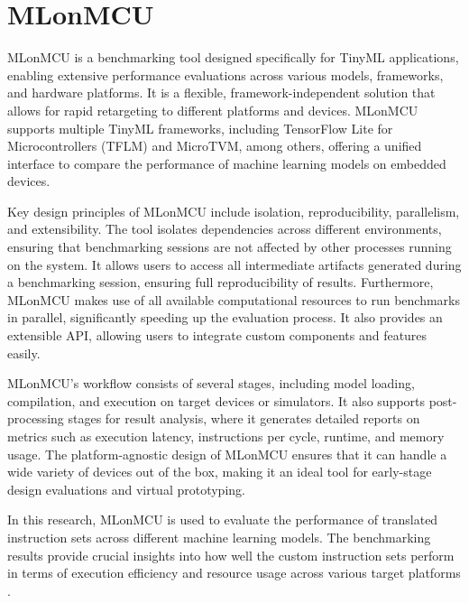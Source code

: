 \section{MLonMCU}
MLonMCU is a benchmarking tool designed specifically for TinyML applications, enabling extensive performance evaluations across various models, frameworks, and hardware platforms. It is a flexible, framework-independent solution that allows for rapid retargeting to different platforms and devices. MLonMCU supports multiple TinyML frameworks, including TensorFlow Lite for Microcontrollers (TFLM) and MicroTVM, among others, offering a unified interface to compare the performance of machine learning models on embedded devices.

Key design principles of MLonMCU include isolation, reproducibility, parallelism, and extensibility. The tool isolates dependencies across different environments, ensuring that benchmarking sessions are not affected by other processes running on the system. It allows users to access all intermediate artifacts generated during a benchmarking session, ensuring full reproducibility of results. Furthermore, MLonMCU makes use of all available computational resources to run benchmarks in parallel, significantly speeding up the evaluation process. It also provides an extensible API, allowing users to integrate custom components and features easily.

MLonMCU's workflow consists of several stages, including model loading, compilation, and execution on target devices or simulators. It also supports post-processing stages for result analysis, where it generates detailed reports on metrics such as execution latency, instructions per cycle, runtime, and memory usage. The platform-agnostic design of MLonMCU ensures that it can handle a wide variety of devices out of the box, making it an ideal tool for early-stage design evaluations and virtual prototyping.

In this research, MLonMCU is used to evaluate the performance of translated instruction sets across different machine learning models. The benchmarking results provide crucial insights into how well the custom instruction sets perform in terms of execution efficiency and resource usage across various target platforms \cite{MLonMCU}.
